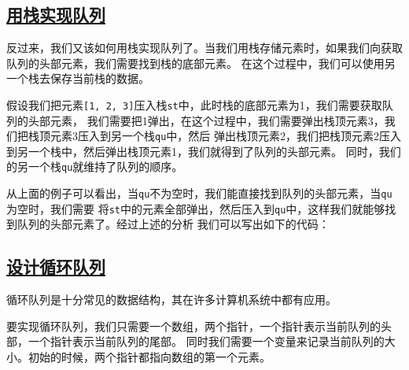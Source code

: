 \documentclass[../../main.tex]{subfiles}
\begin{document}


\subsection{\href{https://leetcode-cn.com/problems/implement-queue-using-stacks/}{用栈实现队列}}

反过来，我们又该如何用栈实现队列了。当我们用栈存储元素时，如果我们向获取队列的头部元素，我们需要找到栈的底部元素。
在这个过程中，我们可以使用另一个栈去保存当前栈的数据。

\begin{example}
  假设我们把元素\texttt{[1, 2, 3]}压入栈\texttt{st}中，此时栈的底部元素为1，我们需要获取队列的头部元素，
  我们需要把1弹出，在这个过程中，我们需要弹出栈顶元素3，我们把栈顶元素3压入到另一个栈\texttt{qu}中，然后
  弹出栈顶元素2，我们把栈顶元素2压入到另一个栈中，然后弹出栈顶元素1，我们就得到了队列的头部元素。
  同时，我们的另一个栈\texttt{qu}就维持了队列的顺序。
\end{example}

从上面的例子可以看出，当\texttt{qu}不为空时，我们能直接找到队列的头部元素，当\texttt{qu}为空时，我们需要
将\texttt{st}中的元素全部弹出，然后压入到\texttt{qu}中，这样我们就能够找到队列的头部元素了。经过上述的分析
我们可以写出如下的代码：



\subsection{\href{https://leetcode-cn.com/problems/design-circular-queue/}{设计循环队列}}

循环队列是十分常见的数据结构，其在许多计算机系统中都有应用。

要实现循环队列，我们只需要一个数组，两个指针，一个指针表示当前队列的头部，一个指针表示当前队列的尾部。
同时我们需要一个变量来记录当前队列的大小。初始的时候，两个指针都指向数组的第一个元素。

\end{document}
